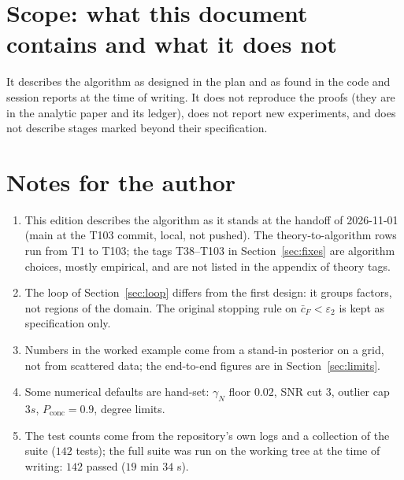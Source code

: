 \section{Scope: what this document contains and what it does not}\label{app:scope}
It describes the algorithm as designed in the plan and as found in the code and session reports at the time of writing. It does not reproduce the proofs (they are in the analytic paper and its ledger), does not report new experiments, and does not describe stages marked \plan{} beyond their specification.

\section{Notes for the author}\label{app:ednotes}
\begin{enumerate}[nosep]
\item This edition describes the algorithm as it stands at the handoff of 2026-11-01 (main at the T103 commit, local, not pushed). The theory-to-algorithm rows run from T1 to T103; the tags T38--T103 in Section~\ref{sec:fixes} are algorithm choices, mostly empirical, and are not listed in the appendix of theory tags.
\item The loop of Section~\ref{sec:loop} differs from the first design: it groups factors, not regions of the domain. The original stopping rule on $\bar c_F<\varepsilon_2$ is kept as specification only.
\item Numbers in the worked example come from a stand-in posterior on a grid, not from scattered data; the end-to-end figures are in Section~\ref{sec:limits}.
\item Some numerical defaults are hand-set: $\gamma_N$ floor $0.02$, SNR cut $3$, outlier cap $3s$, $P_{\mathrm{conc}}=0.9$, degree limits.
\item The test counts come from the repository's own logs and a collection of the suite ($142$ tests); the full suite was run on the working tree at the time of writing: $142$ passed ($19$ min $34$ s).
\end{enumerate}

